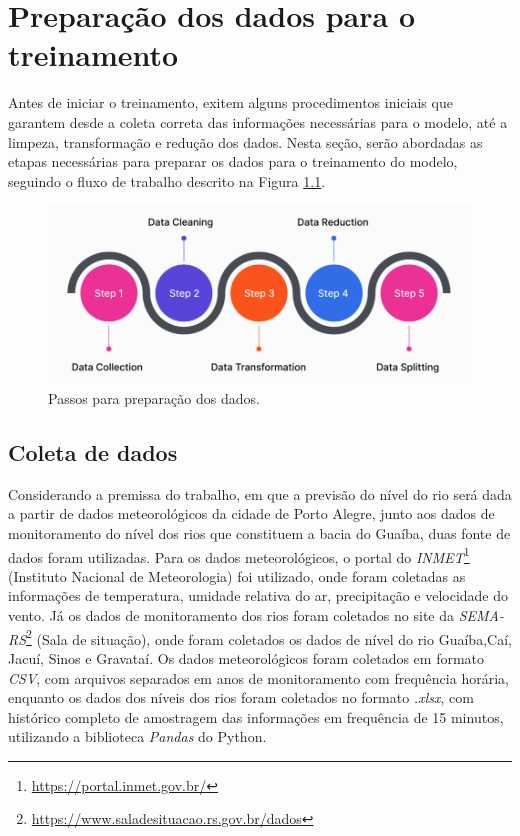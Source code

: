 \chapter{Preparação dos dados para o treinamento}

Antes de iniciar o treinamento, exitem alguns procedimentos iniciais que garantem desde a coleta correta das informações necessárias para o modelo, até a limpeza, transformação e redução dos dados. Nesta seção, serão abordadas as etapas necessárias para preparar os dados para o treinamento do modelo, seguindo o fluxo de trabalho descrito na Figura \ref{fig:passos_preparacao}.

\begin{figure}[H]
	\caption{\label{fig:passos_preparacao}Passos para preparação dos dados.}
	\begin{center}
		\includegraphics[scale=0.4]{figuras/steps_data_preparing.png}
	\end{center}
\end{figure}

\section{Coleta de dados}

Considerando a premissa do trabalho, em que a previsão do nível do rio será dada a partir de dados meteorológicos da cidade de Porto Alegre, junto aos dados de monitoramento do nível dos rios que constituem a bacia do Guaíba, duas fonte de dados foram utilizadas. Para os dados meteorológicos, o portal do \textit{INMET}\footnote{\url{https://portal.inmet.gov.br/}} (Instituto Nacional de Meteorologia) foi utilizado, onde foram coletadas as informações de temperatura, umidade relativa do ar, precipitação e velocidade do vento. Já os dados de monitoramento dos rios foram coletados no site da \textit{SEMA-RS}\footnote{\url{https://www.saladesituacao.rs.gov.br/dados}} (Sala de situação), onde foram coletados os dados de nível do rio Guaíba,Caí, Jacuí, Sinos e Gravataí. Os dados meteorológicos foram coletados em formato \textit{CSV}, com arquivos separados em anos de monitoramento com frequência horária, enquanto os dados dos níveis dos rios foram coletados no formato \textit{.xlsx}, com histórico completo de amostragem das informações em frequência de 15 minutos, utilizando a biblioteca \textit{Pandas} do Python.

